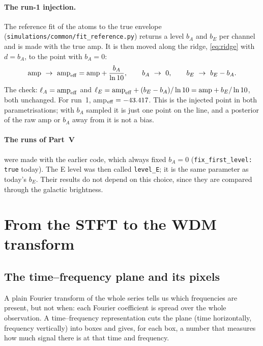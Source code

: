 \documentclass[11pt,a4paper]{article}
\begin{document}
\paragraph{The run-1 injection.} The reference fit of the atoms to the true envelope
(\texttt{simulations/common/fit\_reference.py}) returns a level $b_A$ and $b_E$ per
channel and is made with the true amp. It is then moved along the ridge,
\cref{eq:ridge} with $d=b_A$, to the point with $b_A=0$:
\begin{equation}
  {\rm amp}\ \to\ {\rm amp}_{\rm eff}={\rm amp}+\frac{b_A}{\ln10},\qquad
  b_A\ \to\ 0,\qquad b_E\ \to\ b_E-b_A .
\end{equation}
The check: $\ell_A={\rm amp}_{\rm eff}$ and
$\ell_E={\rm amp}_{\rm eff}+(b_E-b_A)/\ln10={\rm amp}+b_E/\ln10$, both unchanged. For
run~1, amp$_{\rm eff}=-43.417$. This is the injected point in both parametrisations;
with $b_A$ sampled it is just one point on the line, and a posterior of the raw amp or
$b_A$ away from it is not a bias.

\paragraph{The runs of Part~V} were made with the earlier code, which always fixed
$b_A=0$ (\texttt{fix\_first\_level: true} today). The E level was then called
\texttt{level\_E}; it is the same parameter as today's $b_E$. Their results do not
depend on this choice, since they are compared through the galactic brightness.

\section{From the STFT to the WDM transform}\label{sec:wdm}

\subsection{The time--frequency plane and its pixels}

A plain Fourier transform of the whole series tells us which frequencies are present,
but not when: each Fourier coefficient is spread over the whole observation. A
time--frequency representation cuts the plane (time horizontally, frequency
vertically) into boxes and gives, for each box, a number that measures how much
signal there is at that time and frequency.
\end{document}
